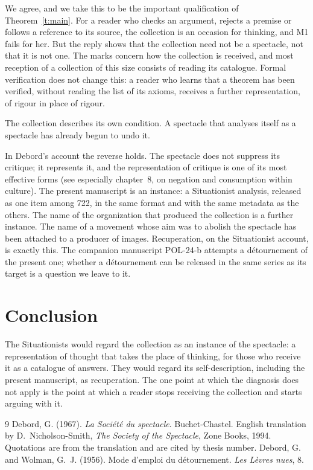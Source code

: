 \documentclass{situationist-preprint}
\begin{document}
\begin{reply}
We agree, and we take this to be the important qualification of Theorem~\ref{t:main}. For a reader who checks an argument, rejects a premise or follows a reference to its source, the collection is an occasion for thinking, and M1 fails for her. But the reply shows that the collection need not be a spectacle, not that it is not one. The marks concern how the collection is received, and most reception of a collection of this size consists of reading its catalogue. Formal verification does not change this: a reader who learns that a theorem has been verified, without reading the list of its axioms, receives a further representation, of rigour in place of rigour.
\end{reply}

\begin{objection}
The collection describes its own condition. A spectacle that analyses itself as a spectacle has already begun to undo it.
\end{objection}

\begin{reply}
In Debord's account the reverse holds. The spectacle does not suppress its critique; it represents it, and the representation of critique is one of its most effective forms (see especially chapter~8, on negation and consumption within culture). The present manuscript is an instance: a Situationist analysis, released as one item among 722, in the same format and with the same metadata as the others. The name of the organization that produced the collection is a further instance. The name of a movement whose aim was to abolish the spectacle has been attached to a producer of images. Recuperation, on the Situationist account, is exactly this. The companion manuscript POL-24-b attempts a détournement of the present one; whether a détournement can be released in the same series as its target is a question we leave to it.
\end{reply}

\section{Conclusion}

The Situationists would regard the collection as an instance of the spectacle: a representation of thought that takes the place of thinking, for those who receive it as a catalogue of answers. They would regard its self-description, including the present manuscript, as recuperation. The one point at which the diagnosis does not apply is the point at which a reader stops receiving the collection and starts arguing with it.

\begin{thebibliography}{9}\small
{} Debord, G. (1967). \emph{La Société du spectacle}. Buchet-Chastel. English translation by D.~Nicholson-Smith, \emph{The Society of the Spectacle}, Zone Books, 1994. Quotations are from the translation and are cited by thesis number.
 Debord, G. and Wolman, G.~J. (1956). Mode d'emploi du détournement. \emph{Les Lèvres nues}, 8.
\end{thebibliography}
\end{document}
